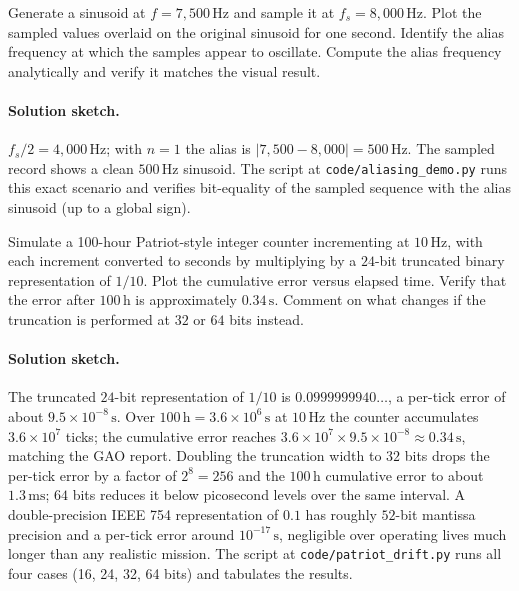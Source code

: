\begin{exercise}
Generate a sinusoid at $f = 7{,}500 \,\si{\hertz}$ and sample it at
$f_{s} = 8{,}000 \,\si{\hertz}$. Plot the sampled values overlaid
on the original sinusoid for one second. Identify the alias
frequency at which the samples appear to oscillate. Compute the
alias frequency analytically and verify it matches the visual
result.

\paragraph{Solution sketch.}
$f_{s}/2 = 4{,}000 \,\si{\hertz}$; with $n = 1$ the alias is
$|7{,}500 - 8{,}000| = 500 \,\si{\hertz}$. The sampled record
shows a clean $500 \,\si{\hertz}$ sinusoid. The script at
\texttt{code/aliasing\_demo.py} runs this exact scenario and
verifies bit-equality of the sampled sequence with the alias
sinusoid (up to a global sign).
\end{exercise}

\begin{exercise}
Simulate a 100-hour Patriot-style integer counter incrementing at
$10 \,\si{\hertz}$, with each increment converted to seconds by
multiplying by a $24$-bit truncated binary representation of $1/10$.
Plot the cumulative error versus elapsed time. Verify that the
error after $100 \,\si{\hour}$ is approximately $0.34 \,\si
{\second}$. Comment on what changes if the truncation is performed
at $32$ or $64$ bits instead.

\paragraph{Solution sketch.}
The truncated $24$-bit representation of $1/10$ is $0.0999999940
\ldots$, a per-tick error of about $9.5 \times 10^{-8} \,\si
{\second}$. Over $100 \,\si{\hour} = 3.6 \times 10^{6} \,\si
{\second}$ at $10 \,\si{\hertz}$ the counter accumulates $3.6
\times 10^{7}$ ticks; the cumulative error reaches $3.6 \times
10^{7} \times 9.5 \times 10^{-8} \approx 0.34 \,\si{\second}$,
matching the GAO report. Doubling the truncation width to $32$
bits drops the per-tick error by a factor of $2^{8} = 256$ and
the $100 \,\si{\hour}$ cumulative error to about $1.3 \,\si
{\milli\second}$; $64$ bits reduces it below picosecond levels
over the same interval. A double-precision IEEE 754 representation
of $0.1$ has roughly $52$-bit mantissa precision and a per-tick
error around $10^{-17} \,\si{\second}$, negligible over operating
lives much longer than any realistic mission. The script at
\texttt{code/patriot\_drift.py} runs all four cases (16, 24, 32,
64 bits) and tabulates the results.
\end{exercise}

